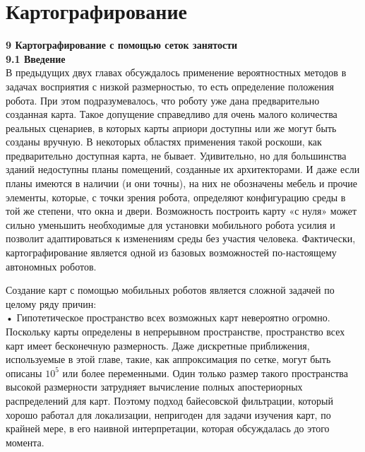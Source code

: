 \documentclass[10pt,a4paper]{article}
\begin{document}
\part{Картографирование}

\textbf{9	Картографирование с помощью сеток занятости}\\

\textbf{9.1	Введение}\\

В предыдущих двух главах обсуждалось применение вероятностных методов в задачах восприятия с низкой размерностью, то есть определение положения робота. При этом подразумевалось, что роботу уже дана предварительно созданная карта. Такое допущение справедливо для очень малого количества реальных сценариев, в которых карты априори доступны или же могут быть созданы вручную. В некоторых областях применения такой роскоши, как предварительно доступная карта, не бывает. Удивительно, но для большинства зданий недоступны планы помещений, созданные их архитекторами. И даже если планы имеются в наличии (и они точны), на них не обозначены мебель и прочие элементы, которые, с точки зрения робота, определяют конфигурацию среды в той же степени, что окна и двери. Возможность построить карту «с нуля» может сильно уменьшить необходимые для установки мобильного робота усилия и позволит адаптироваться к изменениям среды без участия человека. Фактически, картографирование является одной из базовых возможностей по-настоящему автономных роботов.

Создание карт с помощью мобильных роботов является сложной задачей по целому ряду причин:\\

•	Гипотетическое пространство всех возможных карт невероятно огромно. Поскольку карты определены в непрерывном пространстве, пространство всех карт имеет бесконечную размерность. Даже дискретные приближения, используемые в этой главе, такие, как аппроксимация по сетке, могут быть описаны $10^{5}$ или более переменными. Один только размер такого пространства высокой размерности затрудняет вычисление полных апостериорных распределений для карт. Поэтому подход байесовской фильтрации, который хорошо работал для локализации, непригоден для задачи изучения карт, по крайней мере, в его наивной интерпретации, которая обсуждалась до этого момента.\\
\end{document}
